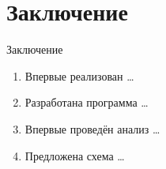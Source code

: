 \section{Заключение}

\begin{frame}{Заключение}
  \begin{enumerate}
    \item Впервые реализован \dots
    \item Разработана программа \dots
    \item Впервые проведён анализ \dots
    \item Предложена схема \dots
  \end{enumerate}
\end{frame}
